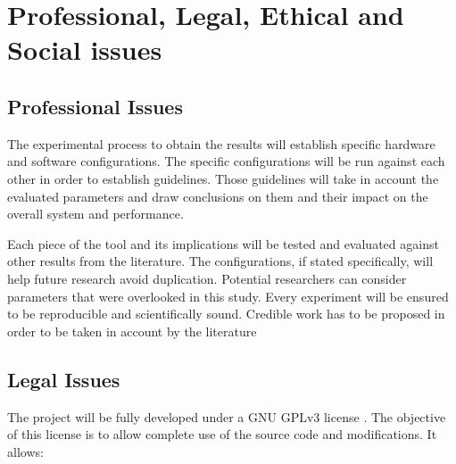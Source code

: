 
\chapter{Professional, Legal, Ethical and Social issues} %

\label{Chapter5} %



\section{Professional Issues}

The experimental process to obtain the results will establish specific hardware and software configurations. The specific configurations will be run against each other in order to establish guidelines. Those guidelines will take in account the evaluated parameters and draw conclusions on them and their impact on the overall system and performance.

Each piece of the tool and its implications will be tested and evaluated against other results from the literature. The configurations, if stated specifically, will help future research avoid duplication. Potential researchers can consider parameters that were overlooked in this study. Every experiment will be ensured to be reproducible and scientifically sound. Credible work has to be proposed in order to be taken in account by the literature


\section{Legal Issues}

The project will be fully developed under a GNU GPLv3 license \cite{GNUGPL}. The objective of this license is to allow complete use of the source code and modifications. It allows:

